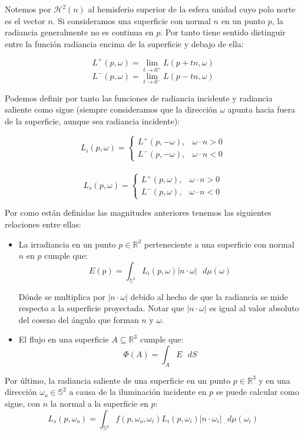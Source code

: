 \begin{itemize}
  Notemos por $\mathcal{H}^2(n)$ al hemisferio superior de la esfera unidad cuyo polo norte es el vector $n$. Si consideramos una superficie con normal $n$ en un punto $p$, la radiancia generalmente no es continua en $p$. Por tanto tiene sentido distinguir entre la función radiancia encima de la superficie y debajo de ella:

  $$L^+(p,\omega) = \lim_{t\rightarrow 0^+} L(p+tn, \omega)$$
  $$L^-(p,\omega) = \lim_{t\rightarrow 0^-} L(p-tn, \omega)$$

  Podemos definir por tanto las funciones de radiancia incidente y radiancia saliente como sigue (siempre consideramos que la dirección $\omega$ apunta hacia fuera de la superficie, aunque sea radiancia incidente):

  \[ L_i(p,\omega) = 
   \begin{cases} 
      L^+(p,- \omega ),  & \omega \cdot n > 0 \\
      L^-(p,- \omega ),  & \omega \cdot n < 0
   \end{cases}
  \] 
  \\
  \[L_s(p,\omega) = 
   \begin{cases} 
      L^+(p, \omega ),  & \omega \cdot n > 0 \\
      L^-(p,\omega ),  & \omega \cdot n < 0
   \end{cases}
  \] 
  
\end{itemize}

Por como están definidas las magnitudes anteriores tenemos las siguientes relaciones entre ellas:

\begin{itemize}
\item La irradiancia en un punto $p\in \mathds{R}^3$ perteneciente a una superficie con normal $n$ en $p$ cumple que:
  $$ E(p) = \int _{\mathds{S}^2} L_i(p,\omega ) |n \cdot \omega| \text{ } d\mu(\omega )$$

  Dónde se multiplica por $| n\cdot \omega |$ debido al hecho de que la radiancia se mide respecto a la superficie proyectada. Notar que $| n\cdot \omega |$ es igual al valor absoluto del coseno del ángulo que forman $n$ y $\omega$.

\item El flujo en una superficie $A\subseteq \mathds{R}^3$ cumple que:
  $$\Phi (A)= \int _A E\text{ }dS$$
\end{itemize}

Por último, la radiancia saliente de una superficie en un punto $p \in \mathds{R}^3$ y en una dirección $\omega _o \in \mathds{S}^2$ a causa de la iluminación incidente en $p$ se puede calcular como sigue, con $n$ la normal a la superficie en $p$:
\begin{equation}\label{dispersion}
L_s(p,\omega _o) = \int _{\mathds{S}^2}f(p,\omega _o, \omega _i) L_i(p, \omega _i) |n\cdot \omega _i|\text{ }d\mu (\omega _i)
\end{equation}

